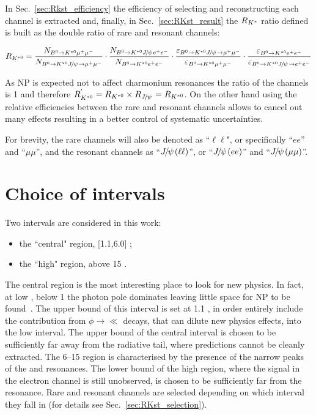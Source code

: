In Sec.~\ref{sec:Rkst_efficiency} the efficiency of selecting and reconstructing each channel is extracted
and, finally, in Sec.~\ref{sec:RKst_result} the $R_{{{K}^*}}$ ratio defined is built as the double ratio
of rare and resonant channels:

\begin{equation}
\label{eq:RKst}
R_{\Kstarz} = 
\frac{N_{\Bz\to\Kstarz \mumu}}{N_{\Bz\to\Kstarz\jpsi\to \mumu}} 
\cdot \frac{N_{\Bz\to\Kstarz \jpsi \ee}}{N_{\Bz\to\Kstarz\ee}}
\cdot \frac{\varepsilon_{\Bz\to\Kstarz \jpsi \to \mumu}}{\varepsilon_{\Bz\to\Kstarz \mumu}} 
\cdot \frac{\varepsilon_{\Bz\to\Kstarz \ee}}{\varepsilon_{\Bz\to\Kstarz\jpsi\to \ee}}
\end{equation}

As NP is expected not to affect charmonium resonances the ratio of the \jpsi channels
is 1 and therefore $R_{\Kstarz}^{'} = R_{\Kstarz} \times R_{\jpsi} = R_{\Kstarz}$.
On the other hand using the relative efficiencies between the rare and resonant channels
allows to cancel out many effects resulting in a better control of systematic uncertainties.  

For brevity, the rare channels will also be denoted as ``$\ell\ell$", or
specifically ``$ee$'' and ``$\mu\mu$'', and the resonant channels as ``$\jpsi(\ell\ell)$'',
or ``$\jpsi(ee)$'' and ``$\jpsi(\mu\mu)$''.

\section{Choice of \qsq intervals}
\label{sec:RKst_q2_choice}

Two \qsq intervals are considered in this work: 
\begin{itemize}
\item the ``central" \qsq region, [1.1,6.0] \gevgevcccc;
\item the ``high" \qsq region, above 15 \gevgevcccc.
\end{itemize}
%
The central \qsq region is the most interesting place to look for new physics. In fact, at low \qsq, below 1 \gevgevcccc
the photon pole dominates leaving little space for NP to be found~\cite{TomRDreview}.
The upper bound of this interval is set at 1.1 \gevgevcccc, in order entirely include the contribution
from $\phi\to\ll$ decays, that can dilute new physics effects, into the low \qsq interval.
The upper bound of the central interval is chosen to be sufficiently far away from the \jpsi radiative
tail, where predictions cannot be cleanly extracted. The 6--15 \gevgevcccc region is characterised by the presence
of the narrow peaks of the \jpsi and \psitwos resonances. The lower bound of the high \qsq region, where
the signal in the electron channel is still unobserved, is chosen to be sufficiently far from the \psitwos resonance.
Rare and resonant channels are selected depending on which \qsq interval they fall in (for details see Sec.~\ref{sec:RKst_selection}).



